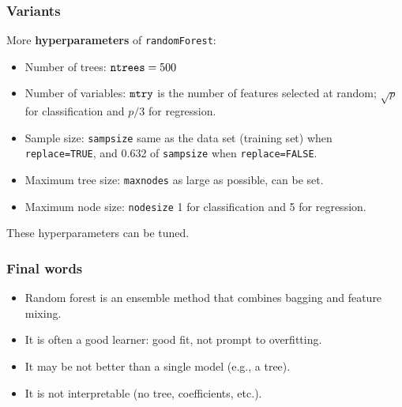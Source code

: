 \begin{frame}
\frametitle{Variants}
More {\bf hyperparameters} of {\tt randomForest}:
\begin{itemize}
\item Number of trees: ${\tt ntrees} = 500$
\item Number of variables: ${\tt mtry}$ is the number of features selected at random; $\sqrt{p}$ for classification and $p/3$ for regression.
\item Sample size: {\tt sampsize} same as the data set (training set) when {\tt replace=TRUE}, and 0.632 of {\tt sampsize} when {\tt replace=FALSE}.
\item Maximum tree size: {\tt maxnodes} as large as possible, can be set.
\item Maximum node size: {\tt nodesize} 1 for classification and 5 for regression.
\end{itemize}
These hyperparameters can be tuned.
\end{frame}
\begin{frame}
\frametitle{Final words}
\begin{itemize}
\item Random forest is an ensemble method that combines bagging and feature mixing.
\item It is often a good learner: good fit, not prompt to overfitting.
\item It may be not better than a single model (e.g., a tree). 
\item It is not interpretable (no tree, coefficients, etc.).
\end{itemize}
\end{frame}
